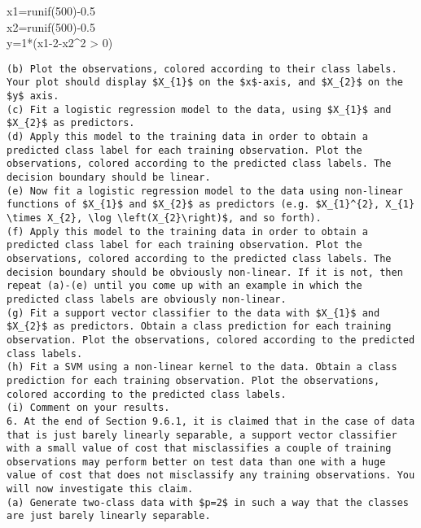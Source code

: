 \documentclass[10pt]{article}
\begin{document}
\begin{displayquote}
x1=runif(500)-0.5\\
x2=runif(500)-0.5\\
y=1*(x1-2-x2\^{}2 > 0)
\end{displayquote}

\begin{verbatim}
(b) Plot the observations, colored according to their class labels. Your plot should display $X_{1}$ on the $x$-axis, and $X_{2}$ on the $y$ axis.
(c) Fit a logistic regression model to the data, using $X_{1}$ and $X_{2}$ as predictors.
(d) Apply this model to the training data in order to obtain a predicted class label for each training observation. Plot the observations, colored according to the predicted class labels. The decision boundary should be linear.
(e) Now fit a logistic regression model to the data using non-linear functions of $X_{1}$ and $X_{2}$ as predictors (e.g. $X_{1}^{2}, X_{1} \times X_{2}, \log \left(X_{2}\right)$, and so forth).
(f) Apply this model to the training data in order to obtain a predicted class label for each training observation. Plot the observations, colored according to the predicted class labels. The decision boundary should be obviously non-linear. If it is not, then repeat (a)-(e) until you come up with an example in which the predicted class labels are obviously non-linear.
(g) Fit a support vector classifier to the data with $X_{1}$ and $X_{2}$ as predictors. Obtain a class prediction for each training observation. Plot the observations, colored according to the predicted class labels.
(h) Fit a SVM using a non-linear kernel to the data. Obtain a class prediction for each training observation. Plot the observations, colored according to the predicted class labels.
(i) Comment on your results.
6. At the end of Section 9.6.1, it is claimed that in the case of data that is just barely linearly separable, a support vector classifier with a small value of cost that misclassifies a couple of training observations may perform better on test data than one with a huge value of cost that does not misclassify any training observations. You will now investigate this claim.
(a) Generate two-class data with $p=2$ in such a way that the classes are just barely linearly separable.


\end{verbatim}
\end{document}
